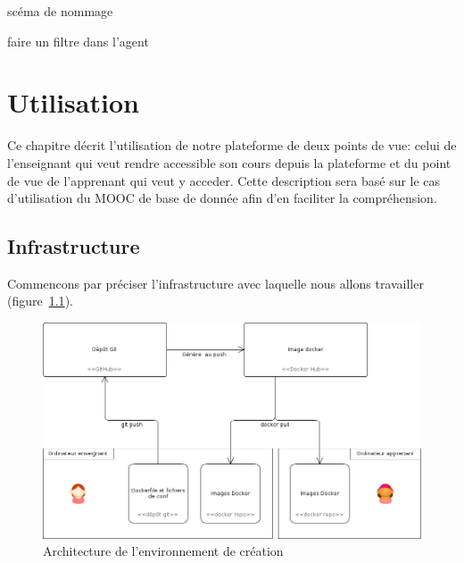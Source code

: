 \documentclass[a4paper,11pt]{report}
\begin{document}
scéma de nommage


faire un filtre dans l'agent

\chapter{Utilisation}

\thispagestyle{fancy}

Ce chapitre décrit l'utilisation de notre plateforme de deux points de vue: celui de l'enseignant qui veut rendre accessible son cours depuis la plateforme et du point de vue de l'apprenant qui veut y acceder.
Cette description sera basé sur le cas d'utilisation du MOOC de base de donnée afin d'en faciliter la compréhension.

\section{Infrastructure}

Commencons par préciser l'infrastructure avec laquelle nous allons travailler (figure~\ref{infrastructure-creation}).

\begin{figure}[!h]
   \caption{\label{infrastructure-creation} Architecture de l'environnement de création}
   \centering
   \includegraphics[width=\textwidth, keepaspectratio=true]{infrastructure-creation.png}
\end{figure}
\end{document}
